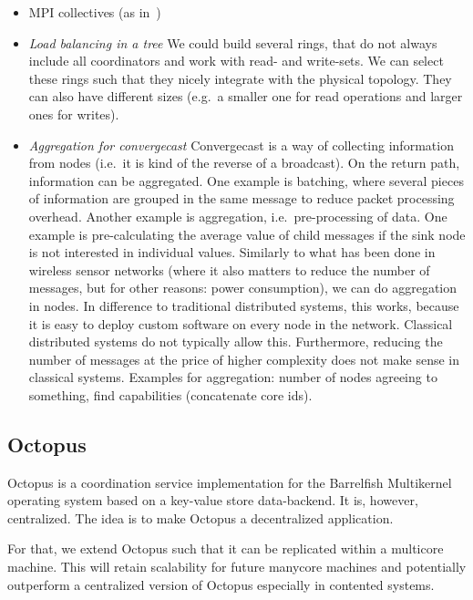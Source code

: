 \documentclass{article}
\begin{document}
\begin{itemize}
\begin{itemize}
\begin{itemize}
    \end{itemize}
  \end{itemize}
\item MPI collectives (as in~\cite{Tu2008})
\item \emph{Load balancing in a tree} We could build several rings,
  that do not always include all coordinators and work with read- and
  write-sets. We can select these rings such that they nicely
  integrate with the physical topology. They can also have different
  sizes (e.g.\ a smaller one for read operations and larger ones for
  writes).
\item \emph{Aggregation for convergecast} %
  Convergecast is a way of collecting information from nodes (i.e.\ it
  is kind of the reverse of a broadcast). On the return path,
  information can be aggregated. One example is batching, where several
  pieces of information are grouped in the same message to reduce packet
  processing overhead. Another example is aggregation, i.e.\
  pre-processing of data. One example is pre-calculating the average
  value of child messages if the sink node is not interested in
  individual values. %
  Similarly to what has been done in wireless sensor networks (where it
  also matters to reduce the number of messages, but for other reasons:
  power consumption), we can do aggregation in nodes. In difference to
  traditional distributed systems, this works, because it is easy to
  deploy custom software on every node in the network. Classical
  distributed systems do not typically allow this. Furthermore, reducing
  the number of messages at the price of higher complexity does not make
  sense in classical systems. %
  Examples for aggregation: number of nodes agreeing to something, find
  capabilities (concatenate core ids). 
\end{itemize}

\subsection{Octopus}

Octopus is a coordination service implementation for the Barrelfish
Multikernel operating system based on a key-value store
data-backend. It is, however, centralized. The idea is to make Octopus
a decentralized application.

For that, we extend Octopus such that it can be replicated within a
multicore machine. This will retain scalability for future manycore
machines and potentially outperform a centralized version of Octopus
especially in contented systems.
\end{document}
